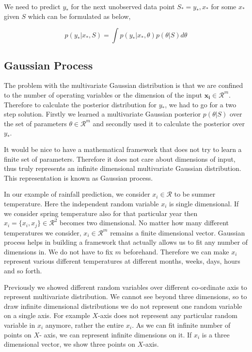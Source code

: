 \documentclass[english]{tktltiki}
\begin{document}
We need to predict $y_*$ for the next unobserved data point $S_* = {y_*, x_*}$ for some $x_*$ given $S$ which can be formulated as below,

\begin{equation}
p(y_* | x_*, S) = \int p(y_* | x_*, \theta)p(\theta | S)d \theta
\end{equation}

\subsection{Gaussian Process}

The problem with the multivariate Gaussian distribution is that we are confined to the number of operating variables or the dimension of the input $\mathbf{x_i} \in \mathcal{R}^m$. Therefore to calculate the posterior distribution for $y_*$, we had to go for a two step solution. Firstly we learned a multivariate Gaussian posterior $p(\theta | S)$ over the set of parameters $\theta \in \mathcal{R}^m$ and secondly used it to calculate the posterior over $y_*$.

It would be nice to have a mathematical framework that does not try to learn a finite set of parameters. Therefore it does not care about dimensions of input, thus truly represents an infinite dimensional multivariate Gaussian distribution. This representation is known as Gaussian process.

In our example of rainfall prediction, we consider $x_i \in \mathcal{R}$ to be summer temperature. Here the independent random variable $x_i$ is single dimensional. If we consider spring temperature also for that particular year then $x_i = \{x_i, x_j\} \in \mathcal{R}^2$ becomes two dimensional. No matter how many different temperatures we consider, $x_i \in \mathcal{R}^m$ remains a finite dimensional vector. Gaussian process helps in building a framework that actually allows us to fit any number of dimensions in. We do not have to fix $m$ beforehand. Therefore we can make $x_i$ represent various different temperatures at different months, weeks, days, hours and so forth.

Previously we showed different random variables over different co-ordinate axis to represent multivariate distribution. We cannot see beyond three dimensions, so to draw infinite dimensional distributions we do not represent one random variable on a single axis. For example $X$-axis does not represent any particular random variable in $x_i$ anymore, rather the entire $x_i$. As we can fit infinite number of points on $X$- axis, we can represent infinite dimensions on it. If $x_i$ is a three dimensional vector, we show three points on $X$-axis.
\end{document}
